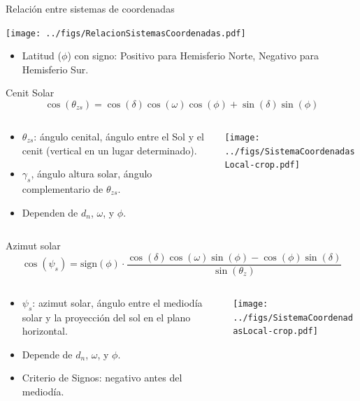 \documentclass[xcolor={usenames,svgnames,dvipsnames}]{beamer}
\begin{document}
\begin{frame}[label={sec:orgc070801}]{Relación entre sistemas de coordenadas}
\begin{center}
\texttt{[image: ../figs/RelacionSistemasCoordenadas.pdf]}
\end{center}

\begin{itemize}
\item \alert{Latitud (\(\phi\)) con signo}: Positivo para Hemisferio Norte, Negativo para Hemisferio Sur.
\end{itemize}
\end{frame}

\begin{frame}[label={sec:orged5ed9e},plain]{Cenit Solar}
\[
\cos(\theta_{zs}) = \cos(\delta) \cos(\omega) \cos(\phi) + \sin(\delta) \sin(\phi)
\]

\begin{columns}
\begin{column}{0.55\columnwidth}
\begin{itemize}
\item \(\theta_{zs}\): \alert{ángulo cenital}, ángulo entre el Sol y el cenit (vertical en un lugar determinado).
\item \(\gamma_s\), \alert{ángulo altura solar}, ángulo complementario de \(\theta_{zs}\).
\item Dependen de \(d_n\), \(\omega\), y \(\phi\).
\end{itemize}
\end{column}
\begin{column}{0.5\columnwidth}
\begin{center}
\texttt{[image: ../figs/SistemaCoordenadasLocal-crop.pdf]}
\end{center}
\end{column}
\end{columns}
\end{frame}

\begin{frame}[label={sec:orgf166088},plain]{Azimut solar}
\[
  \cos(\psi_{s}) = \mathrm{sign}(\phi) \cdot \frac{\cos(\delta) \cos(\omega) \sin(\phi) - \cos(\phi) \sin(\delta)} {\sin(\theta_{z})}
\]
\begin{columns}
\begin{column}{0.55\columnwidth}
\begin{itemize}
\item \(\psi_s\): \alert{azimut solar}, ángulo entre el mediodía solar y la proyección del sol en el plano horizontal.
\item Depende de \(d_n\), \(\omega\), y \(\phi\).
\item Criterio de Signos: negativo antes del mediodía.
\end{itemize}
\end{column}

\begin{column}{0.5\columnwidth}
\begin{center}
\texttt{[image: ../figs/SistemaCoordenadasLocal-crop.pdf]}
\end{center}
\end{column}
\end{columns}
\end{frame}
\end{document}
